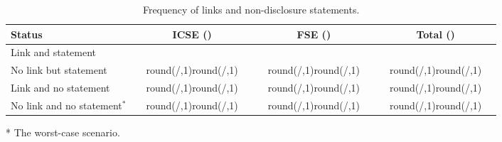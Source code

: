 \documentclass{article}
\newcommand{\ShowPercentageNoHundred}[2]{%
    \edef\percentage{\fpeval{round(#1/#2*100,1)}}%
    \ifdim\percentage pt < 10pt
        (\hspace*{4.3pt}\num{\percentage}\%)
    \else
        (\num{\percentage}\%)
    \fi
}
\newcommand*\ChartWithAbsoluteAndPercentageNumbers[2]{
    \numprint{#1}&
    \ShowPercentageNoHundred{#1}{#2}&
    \raisebox{-0.05em}{\inlinechart{#1}{#2}}
}
\newlength\BARSIZE  \setlength\BARSIZE{0.9cm}
\newcommand{\inlinechart}[2]{%
    \edef\blackbar{\fpeval{#1/#2}}%
    \edef\whitebar{\fpeval{1 - (#1/#2)}}%
    \textcolor{black!80}{\rule{\blackbar\BARSIZE}{1.6ex}}%
    \textcolor{black!10}{\rule{\whitebar\BARSIZE}{1.6ex}}%
}
\begin{document}
\begin{table}[htbp]
\caption{Frequency of links and non-disclosure statements.}
\label{tab:frequency-links-and-statements}
\centering
\small
\begin{threeparttable}
\begin{tabular}{@{} l  @{\hskip 0.2in} r @{\hskip 0.04in} l @{\hskip 0.7mm} l @{\hskip 0.2in} r @{\hskip 0.04in} l @{\hskip 0.7mm} l @{\hskip 0.2in} r @{\hskip 0.04in} l @{\hskip 0.7mm} l @{}}
\toprule
Status &
  \multicolumn{3}{c}{ICSE (\numprint{\varTotalOfPapersICSE})} &
  \multicolumn{3}{c}{FSE (\numprint{\varTotalOfPapersFSE})} &
  \multicolumn{3}{c}{Total (\numprint{\varTotalOfPapersICSEFSE})} \\ 
  \midrule
Link and statement &
  \ChartWithAbsoluteAndPercentageNumbers{\varLinkYesStatementYesICSE}{\varTotalOfPapersICSE} &
  \ChartWithAbsoluteAndPercentageNumbers{\varLinkYesStatementYesFSE}{\varTotalOfPapersFSE} &
  \ChartWithAbsoluteAndPercentageNumbers{\varLinkYesStatementYesICSEFSE}{\varTotalOfPapersICSEFSE}
  \\
No link but statement &
  \ChartWithAbsoluteAndPercentageNumbers{\varLinkNoStatementYesICSE}{\varTotalOfPapersICSE} &
  \ChartWithAbsoluteAndPercentageNumbers{\varLinkNoStatementYesFSE}{\varTotalOfPapersFSE} &
  \ChartWithAbsoluteAndPercentageNumbers{\varLinkNoStatementYesICSEFSE}{\varTotalOfPapersICSEFSE}
  \\
Link and no statement &
  \ChartWithAbsoluteAndPercentageNumbers{\varLinkYesStatementNoICSE}{\varTotalOfPapersICSE} &
  \ChartWithAbsoluteAndPercentageNumbers{\varLinkYesStatementNoFSE}{\varTotalOfPapersFSE} &
  \ChartWithAbsoluteAndPercentageNumbers{\varLinkYesStatementNoICSEFSE}{\varTotalOfPapersICSEFSE}
  \\
No link and no statement$^*$ &
  \ChartWithAbsoluteAndPercentageNumbers{\varLinkNoStatementNoICSE}{\varTotalOfPapersICSE} &
  \ChartWithAbsoluteAndPercentageNumbers{\varLinkNoStatementNoFSE}{\varTotalOfPapersFSE} &
  \ChartWithAbsoluteAndPercentageNumbers{\varLinkNoStatementNoICSEFSE}{\varTotalOfPapersICSEFSE}
  \\ 
  \bottomrule
\end{tabular}
\begin{tablenotes}[flushleft]
            \item[*]{\footnotesize{The worst-case scenario.}}
\end{tablenotes}
\end{threeparttable}
\end{table}
\end{document}
